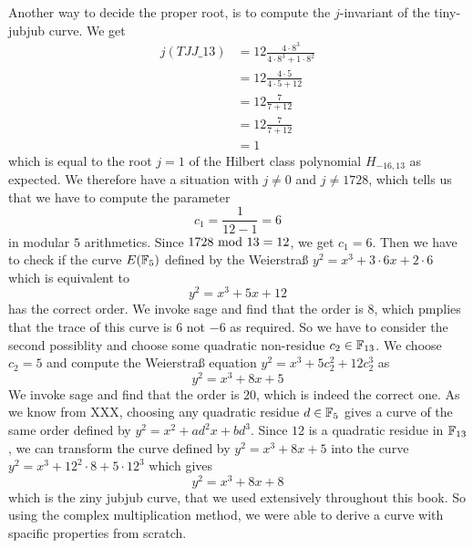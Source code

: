 \begin{example}
Another way to decide the proper root, is to compute the $j$-invariant of the tiny-jubjub curve. We get
\begin{align*}
j(\mathit{TJJ\_13}) & = 12\frac{4\cdot 8^3}{4\cdot 8^3+ 1\cdot 8^2}\\
                    & = 12\frac{4\cdot 5}{4\cdot 5+ 12}\\
                    & = 12\frac{7}{7+ 12}\\
                    & = 12\frac{7}{7+ 12}\\
                    & = 1
\end{align*}
which is equal to the root $j=1$ of the Hilbert class polynomial $H_{-16,13}$ as expected. We therefore have a situation with $j\neq 0$ and $j\neq 1728$, which tells us that we have to compute the parameter
$$
c_1=\frac{1}{12-1} = 6
$$
in modular $5$ arithmetics. Since $1728 \text{ mod } 13=12$, we get $c_1=6$. Then we have to check if the curve $E(\mathbb{F}_5)$ defined by the Weierstraß  $y^2 = x^3 + 3\cdot 6 x + 2\cdot 6$ which is equivalent to
$$
y^2 = x^3 + 5x +12
$$ has the correct order. We invoke sage and find that the order is $8$, which pmplies that the trace of this curve is $6$ not $-6$ as required. So we have to consider the second possiblity and choose some quadratic non-residue $c_2\in\mathbb{F}_{13}$. We choose $c_2=5$ and compute the Weierstraß equation $y^2 = x^3 + 5 c_2^2 + 12 c_2^3$ as
$$
y^2 = x^3 + 8 x + 5
$$
We invoke sage and find that the order is $20$, which is indeed the correct one. As we know from XXX, choosing any quadratic residue $d\in \mathbb{F}_5$ gives a curve of the same order defined by $y^2 = x^2 + a d^2 x + bd^3$. Since $12$ is a quadratic residue in $\mathbb{F}_{13}$, we can transform the curve defined by 
$y^2 = x^3 +8x+5$ into the curve $y^2 = x^3 + 12^2\cdot 8 + 5\cdot 12^3$ which gives 
$$
y^2 = x^3 + 8x +8
$$
which is the ziny jubjub curve, that we used extensively throughout this book. So using the complex multiplication method, we were able to derive a curve with spacific properties from scratch.
\end{example}
